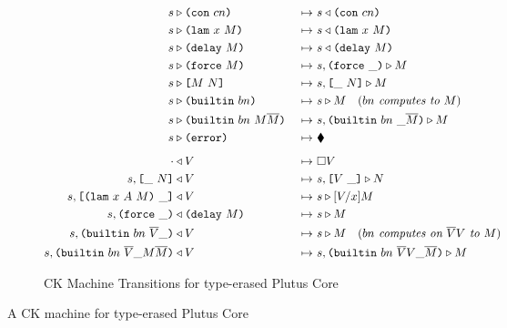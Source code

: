 \documentclass[../plutus-core-specification.tex]{subfiles}
\begin{document}
\begin{figure}[H]
\ContinuedFloat
  \begin{subfigure}[c]{\linewidth}

    \begin{minipage}{\linewidth}
\begin{alignat*}{2}
  s & \compute \con{cn}                          &~\mapsto~& s \return \con{cn}\\
  s & \compute \lamU{x}{M}                       &~\mapsto~& s \return \lamU{x}{M}\\
  s & \compute \delay{M}                         &~\mapsto~& s \return \delay{M}\\
  s & \compute \force{M}                         &~\mapsto~& s,\inForceFrame{} \compute M \\
  s & \compute \appU{M}{N}                       &~\mapsto~& s,\inAppLeftFrame{N} \compute M\\
  s & \compute \builtinU{bn}{\!\!}               &~\mapsto~& s \compute M
                                                 \quad (\textit{$bn$ computes to $M$}) \\
  s & \compute \builtinU{bn}{M \repetition{M}}   &~\mapsto~& s,\inBuiltinU{bn}{}{\_}{\repetition{M}} \compute M\\
  s & \compute \errorU                           &~\mapsto~& \ckerror{}\\
  \\[-10pt] %
  \cdot & \return V                              &~\mapsto~& \square V\\
  s,\inAppLeftFrame{N} & \return V               &~\mapsto~& s,\inAppRightFrame{V} \compute N\\
  s,\inAppRightFrame{\lam{x}{A}{M}} & \return V  &~\mapsto~& s \compute \subst{V}{x}{M}\\
  s,\inForceFrame{} & \return \delay{M}          &~\mapsto~& s \compute M\\
  s,\inBuiltinU{bn}{\repetition{V}}{\_}{} & \return V
                                                 &~\mapsto~&  s \compute M
                                                 \quad (\textit{$bn$ computes on $\repetition{V}V$ to $M$})\\
  s,\inBuiltinU{bn}{\repetition{V}}{\_}{M \repetition{M}} & \return V
                                                 &~\mapsto~& s,\inBuiltinU{bn}{\repetition{V} V}{\_}{\repetition{M}}
                                                 \compute M\\
    \end{alignat*}
\end{minipage}
    \caption{CK Machine Transitions for type-erased Plutus Core}
    \label{fig:erased-ck-transitions}
\end{subfigure}
\caption{A CK machine for type-erased Plutus Core}
\label{fig:erased-ck-machine}
\end{figure}
\end{document}
